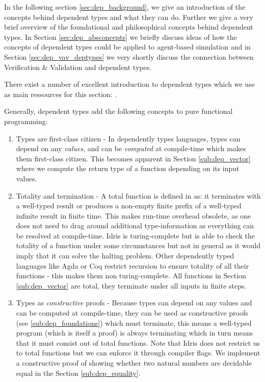 In the following section \ref{sec:dep_background}, we give an introduction of the concepts behind dependent types and what they can do. Further we give a very brief overview of the foundational and philosophical concepts behind dependent types. In Section \ref{sec:dep_absconcepts} we briefly discuss ideas of how the concepts of dependent types could be applied to agent-based simulation and in Section \ref{sec:dep_vav_deptypes} we very shortly discuss the connection between Verification \& Validation and dependent types.

There exist a number of excellent introduction to dependent types which we use as main ressources for this section: \cite{thompson_type_1991, program_homotopy_2013, stump_verified_2016, brady_type-driven_2017, pierce_programming_2018}.

Generally, dependent types add the following concepts to pure functional programming:

\begin{enumerate}
	\item Types are first-class citizen - In dependently types languages, types can depend on any \textit{values}, and can be \textit{computed} at compile-time which makes them first-class citizen. This becomes apparent in Section \ref{sub:dep_vector} where we compute the return type of a function depending on its input values.

	\item Totality and termination - A total function is defined in \cite{brady_type-driven_2017} as: it terminates with a well-typed result or produces a non-empty finite prefix of a well-typed infinite result in finite time. This makes run-time overhead obsolete, as one does not need to drag around additional type-information as everything can be resolved at compile-time. Idris is turing-complete but is able to check the totality of a function under some circumstances but not in general as it would imply that it can solve the halting problem. Other dependently typed languages like Agda or Coq restrict recursion to ensure totality of all their functions - this makes them non turing-complete. All functions in Section \ref{sub:dep_vector} are total, they terminate under all inputs in finite steps.

	\item Types as \textit{constructive} proofs - Because types can depend on any values and can be computed at compile-time, they can be used as constructive proofs (see \ref{sub:dep_foundations}) which must terminate, this means a well-typed program (which is itself a proof) is always terminating which in turn means that it must consist out of total functions. Note that Idris does not restrict us to total functions but we can enforce it through compiler flags. We implement a constructive proof of showing whether two natural numbers are decidable equal in the Section \ref{sub:dep_equality}.
\end{enumerate}

